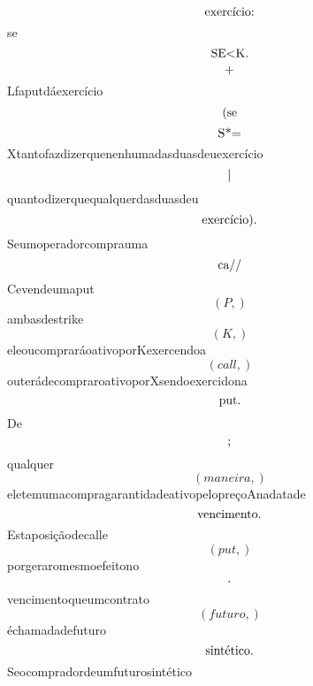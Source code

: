 \documentclass{article}
\begin{document}
\begin{equation}
$exercício:$
\end{equation}se\begin{equation}
$SE<K.$
\end{equation}\begin{equation}
$+$
\end{equation}Lfaputdáexercício\begin{equation}
$(se$
\end{equation}\begin{equation}
$S*=$
\end{equation}Xtantofazdizerquenenhumadasduasdeuexercício\begin{equation}
$|$
\end{equation}quantodizerquequalquerdasduasdeu\begin{equation}
$exercício).$
\end{equation}Seumoperadorcomprauma\begin{equation}
$ca//$
\end{equation}Cevendeumaput\begin{equation}
\left( P,\right)
\end{equation}ambasdestrike\begin{equation}
\left( K,\right)
\end{equation}eleoucompraráoativoporKexercendoa\begin{equation}
\left( call,\right)
\end{equation}outerádecompraroativoporXsendoexercidona\begin{equation}
$put.$
\end{equation}De\begin{equation}
$;$
\end{equation}qualquer\begin{equation}
\left( maneira,\right)
\end{equation}eletemumacompragarantidadeativopelopreçoAnadatade\begin{equation}
$vencimento.$
\end{equation}Estaposiçãodecalle\begin{equation}
\left( put,\right)
\end{equation}porgeraromesmoefeitono\begin{equation}
$.$
\end{equation}vencimentoqueumcontrato\begin{equation}
\left( futuro,\right)
\end{equation}échamadadefuturo\begin{equation}
$sintético.$
\end{equation}Seocompradordeumfuturosintético\begin{equation}

\end{equation}
\end{document}
